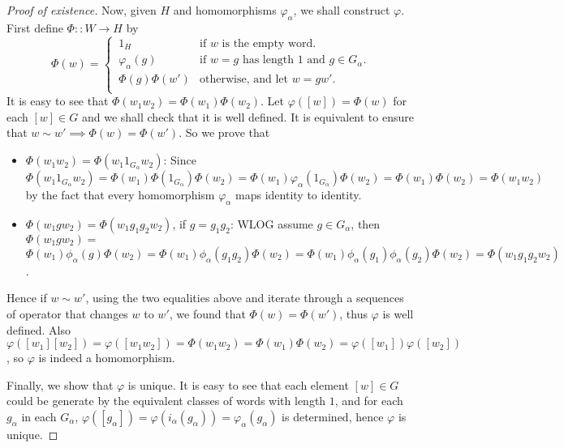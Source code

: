\documentclass[a4paper,titlepage]{article}
\theoremstyle{remark}
\theoremstyle{definition}
\theoremstyle{definition}
\theoremstyle{plain}
\begin{document}
\begin{proof}[Proof of existence]
    Now, given $H$ and homomorphisms $\varphi_\alpha$, we shall construct $\varphi$. First define 
    $\Phi :: W \to H$ by
    \[ 
      \Phi(w) =
      \begin{cases}
        \, 1_H & \text{if } w \text{ is the empty word.} \\
        \, \varphi_\alpha(g) & \text{if } w = g \text{ has length 1 and } g \in G_\alpha. \\ 
        \, \Phi(g) \Phi(w') & \text{otherwise, and let } w = g w'. \\ 
      \end{cases}
    \]
    It is easy to see that $\Phi(w_1 w_2) = \Phi(w_1) \Phi(w_2)$. Let $\varphi([w]) = \Phi(w)$ for
    each $[w] \in G$ and we shall check that it is well defined. It is equivalent to
    ensure that $w \sim w' \implies \Phi(w) = \Phi(w')$. So we prove that
    \begin{itemize}
      \item $\Phi(w_1 w_2) = \Phi(w_1 1_{G_\alpha} w_2)$: Since $\Phi(w_1 1_{G_\alpha} w_2) 
        = \Phi(w_1) \Phi(1_{G_\alpha}) \Phi(w_2) = \Phi(w_1) \varphi_\alpha(1_{G_\alpha}) \Phi(w_2)
        = \Phi(w_1) \Phi(w_2) = \Phi(w_1 w_2)$ by the fact that every homomorphism $\varphi_\alpha$ maps
        identity to identity.
      \item $\Phi(w_1 g w_2) = \Phi(w_1 g_1 g_2 w_2)$, if $g = g_1 g_2$: WLOG assume $g \in G_\alpha$, then 
        $\Phi(w_1 g w_2) = $ \\
        $ \Phi(w_1) \phi_\alpha(g) \Phi(w_2) = \Phi(w_1) \phi_\alpha(g_1 g_2) \Phi(w_2)
        = \Phi(w_1) \phi_\alpha(g_1) \phi_\alpha(g_2) \Phi(w_2) = \Phi(w_1 g_1 g_2 w_2)$. 
    \end{itemize}
    Hence if $w \sim w'$, using the two equalities above and iterate through a sequences of
    operator that changes $w$ to $w'$, we found that $\Phi(w) = \Phi(w')$, thus $\varphi$ is
    well defined. Also $\varphi([w_1][w_2]) = \varphi([w_1 w_2]) = \Phi(w_1 w_2) = \Phi(w_1) \Phi(w_2)
    = \varphi([w_1]) \varphi([w_2])$, so $\varphi$ is indeed a homomorphism.

    Finally, we show that $\varphi$ is unique. It is easy to see that each element
    $[w] \in G$ could be generate by the equivalent classes of words with length $1$, 
    and for each $g_\alpha$ in each $G_\alpha$, $\varphi([g_\alpha]) = \varphi(i_\alpha(g_\alpha)) =
    \varphi_\alpha(g_\alpha)$ is determined, hence $\varphi$ is unique.
  \end{proof}
\end{document}
